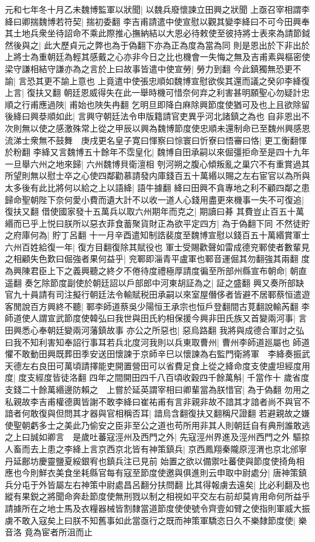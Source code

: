 元和七年冬十月乙未魏博監軍以狀聞|{
	以魏兵廢懷諫立田興之狀聞}
上亟召宰相謂李絳曰卿揣魏博若符契|{
	揣初委翻}
李吉甫請遣中使宣慰以觀其變李絳曰不可今田興奉其土地兵衆坐待詔命不乘此際推心撫納結以大恩必待敕使至彼持將士表來為請節鉞然後與之|{
	此大歷貞元之弊也為于偽翻下亦為正為度為當為同}
則是恩出於下非出於上將士為重朝廷為輕其感戴之心亦非今日之比也機會一失悔之無及吉甫素與樞密使梁守謙相結守謙亦為之言於上曰故事皆遣中使宣勞|{
	勞力到翻}
今此鎮獨無恐更不諭|{
	言恐其更不諭上意也}
上竟遣中使張忠順如魏博宣慰欲俟其還而議之癸卯李絳復上言|{
	復扶又翻}
朝廷恩威得失在此一舉時機可惜奈何弃之利害甚明願聖心勿疑計忠順之行甫應過陜|{
	甫始也陜失冉翻}
乞明旦即降白麻除興節度使猶可及也上且欲除留後絳曰興㳟順如此|{
	言興守朝廷法令申版籍請官吏異乎河北諸鎮之為也}
自非恩出不次則無以使之感激殊常上從之甲辰以興為魏博節度使忠順未還制命已至魏州興感恩流涕士衆無不鼓舞　庚戌更名皇子寛曰惲察曰悰寰曰忻寮曰悟審曰恪|{
	更工衡翻惲於粉翻}
李絳又言魏博五十餘年不霑皇化|{
	魏博自田承嗣以來倔彊拒命至是四十九年}
一旦舉六州之地來歸|{
	六州魏博貝衛澶相}
刳河朔之腹心傾叛亂之巢穴不有重賞過其所望則無以慰士卒之心使四鄰勸慕請發内庫錢百五十萬緡以賜之左右宦官以為所與太多後有此比將何以給之上以語絳|{
	語牛據翻}
絳曰田興不貪專地之利不顧四鄰之患歸命聖朝陛下奈何愛小費而遺大計不以收一道人心錢用盡更來機事一失不可復追|{
	復扶又翻}
借使國家發十五萬兵以取六州期年而克之|{
	期讀曰朞}
其費豈止百五十萬緡而已乎上悦曰朕所以惡衣菲食蓄聚貨財正為欲平定四方|{
	為于偽翻下同}
不然徒貯之府庫何為|{
	貯丁呂翻}
十一月辛酉遣知制誥裴度至魏博宣慰以錢百五十萬緡賞軍士六州百姓給復一年|{
	復方目翻復除其賦役也}
軍士受賜歡聲如雷成德兖鄆使者數輩見之相顧失色歎曰倔強者果何益乎|{
	兖鄆即淄青平盧軍也鄆音運倔其勿翻強其兩翻}
度為興陳君臣上下之義興聽之終夕不倦待度禮極厚請度徧至所部州縣宣布朝命|{
	朝直遥翻}
奏乞除節度副使於朝廷詔以戶部郎中河東胡証為之|{
	証之盛翻}
興又奏所部缺官九十員請有司注擬行朝廷法令輸賦税田承嗣以來室屋僭侈者皆避不居鄆蔡恒遣遊客閒說百方興終不聽|{
	鄆李師道蔡吳少陽恒王承宗也恒戶登翻間古莧翻說輸芮翻}
李師道使人謂宣武節度使韓弘曰我世與田氏約相保援今興非田氏族又首變兩河事|{
	言田興悉心奉朝廷變兩河藩鎮故事}
亦公之所惡也|{
	惡烏路翻}
我將與成德合軍討之弘曰我不知利害知奉詔行事耳若兵北度河我則以兵東取曹州|{
	曹州李師道廵屬也}
師道懼不敢動田興既葬田季安送田懷諫于京師辛巳以懷諫為右監門衛將軍　李絳奏振武天德左右良田可萬頃請擇能吏開置營田可以省費足食上從之絳命度支使盧坦經度用度|{
	度支經度皆徒洛翻}
四年之間開田四千八百頃收穀四千餘萬斛|{
	千當作十}
歲省度支錢二十餘萬緡邊防賴之　上嘗於延英謂宰相曰卿輩當為朕惜官|{
	為于偽翻}
勿用之私親故李吉甫權德輿皆謝不敢李絳曰崔祐甫有言非親非故不諳其才諳者尚不與官不諳者何敢復與但問其才器與官相稱否耳|{
	諳烏含翻復扶又翻稱尺證翻}
若避親故之嫌使聖朝虧多士之美此乃偷安之臣非至公之道也苟所用非其人則朝廷自有典刑誰敢逃之上曰誠如卿言　是歲吐蕃寇涇州及西門之外|{
	先寇涇州界進及涇州西門之外}
驅掠人畜而去上患之李絳上言京西京北皆有神策鎮兵|{
	京西鳳翔秦隴原涇渭也京北邠寧丹延鄜坊慶靈鹽夏綏銀宥也鎮兵注已見前}
始置之欲以備禦吐蕃使與節度使掎角相應也今則鮮衣美食坐耗縣官每有寇至節度使邀與俱進則云申取中尉處分|{
	唐神策鎮兵分屯于外皆屬左右神策中尉處昌呂翻分扶問翻}
比其得報虜去遠矣|{
	比必利翻及也}
縱有果鋭之將聞命奔赴節度使無刑戮以制之相視如平交左右前却莫肯用命何所益乎請據所在之地士馬及衣糧器械皆割隸當道節度使使號令齊壹如臂之使指則軍威大振虜不敢入寇矣上曰朕不知舊事如此當亟行之既而神策軍驕恣日久不樂隸節度使|{
	樂音洛}
竟為宦者所沮而止


